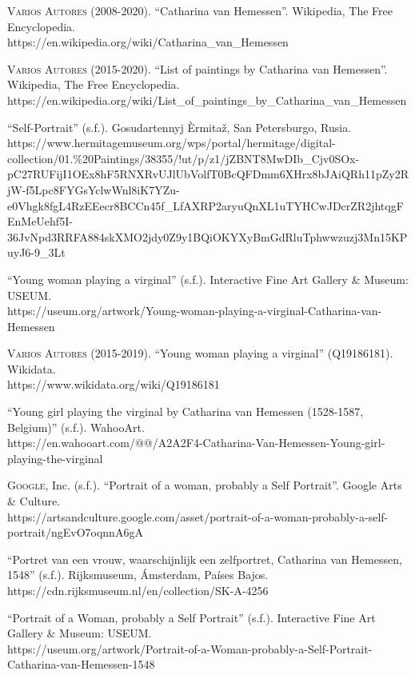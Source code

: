 \documentclass[12pt]{report}
\begin{document}
\textsc{Varios Autores} (2008-2020). ``Catharina van Hemessen''. Wikipedia, The Free Encyclopedia.\\
https://en.wikipedia.org/wiki/Catharina_van_Hemessen\bigskip

\textsc{Varios Autores} (2015-2020). ``List of paintings by Catharina van Hemessen''. Wikipedia, The Free Encyclopedia.\\
https://en.wikipedia.org/wiki/List_of_paintings_by_Catharina_van_Hemessen\bigskip

``Self-Portrait'' (s.f.). Gosudartennyj Èrmitaž, San Petersburgo, Rusia.\\
https://www.hermitagemuseum.org/wps/portal/hermitage/digital-collection/01.\%20Paintings/38355/!ut/p/z1/jZBNT8MwDIb_Cjv0SOx-pC27RUFijI1OEx8hF5RNXRvUJlUbVolfT0BcQFDmm6XHrx8bJAiQRh11pZy2RjW-f5Lpc8FYGsYclwWnl8iK7YZu-e0Vhgk8fgL4RzEEecr8BCCn45f_LfAXRP2aryuQnXL1uTYHCwJDcrZR2jhtqgFEnMeUehf5I-36JvNpd3RRFA884skXMO2jdy0Z9y1BQiOKYXyBmGdRluTphwwzuzj3Mn15KPuyJ6-9_3Lt\bigskip

``Young woman playing a virginal'' (s.f.). Interactive Fine Art Gallery \& Museum: USEUM.\\
https://useum.org/artwork/Young-woman-playing-a-virginal-Catharina-van-Hemessen\bigskip

\textsc{Varios Autores} (2015-2019). ``Young woman playing a virginal'' (Q19186181). Wikidata.\\
https://www.wikidata.org/wiki/Q19186181\bigskip

``Young girl playing the virginal by Catharina van Hemessen (1528-1587, Belgium)'' (s.f.). WahooArt.\\
https://en.wahooart.com/@@/A2A2F4-Catharina-Van-Hemessen-Young-girl-playing-the-virginal\bigskip

\textsc{Google}, Inc. (s.f.). ``Portrait of a woman, probably a Self Portrait''. Google Arts \& Culture.\\
https://artsandculture.google.com/asset/portrait-of-a-woman-probably-a-self-portrait/ngEvO7oqnnA6gA\bigskip

``Portret van een vrouw, waarschijnlijk een zelfportret, Catharina van Hemessen, 1548'' (s.f.). Rijksmuseum, Ámsterdam, Países Bajos.\\
https://cdn.rijksmuseum.nl/en/collection/SK-A-4256\bigskip

``Portrait of a Woman, probably a Self Portrait'' (s.f.). Interactive Fine Art Gallery \& Museum: USEUM.\\
https://useum.org/artwork/Portrait-of-a-Woman-probably-a-Self-Portrait-Catharina-van-Hemessen-1548\bigskip
\end{document}
